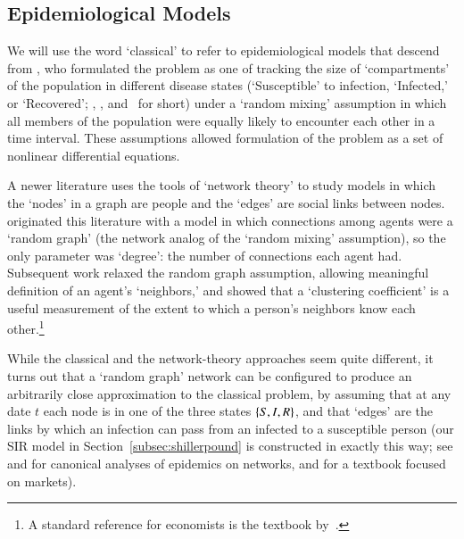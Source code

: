 \subsection{Epidemiological Models}\label{subsec:epiNet}

We will use the word `classical' to refer to epidemiological models that descend from \cite{kermack_contribution_1927}, who formulated the problem as one of tracking the size of `compartments' of the population in different disease states (`Susceptible' to infection, `Infected,' or `Recovered'; \Susceptible, \Infected, and \Recovered~for short) under a `random mixing' assumption in which all members of the population were equally likely to encounter each other in a time interval.  These assumptions allowed formulation of the problem as a set of nonlinear differential equations.

A newer literature uses the tools of `network theory' to study models in which the `nodes' in a graph are people and the `edges' are social links between nodes.  \cite{erdos1960evolution} originated this literature with a model in which connections among agents were a `random graph' (the network analog of the `random mixing' assumption), so the only parameter was `degree': the number of connections each agent had.  Subsequent work relaxed the random graph assumption, allowing meaningful definition of an agent's `neighbors,' and showed that a `clustering coefficient' is a useful measurement of the extent to which a person's neighbors know each other.\footnote{A standard reference for economists is the textbook by~\cite{jackson_social_2010}.}



While the classical and the network-theory approaches seem quite different, it turns out that a `random graph' network can be configured to produce an arbitrarily close approximation to the classical problem, by assuming that at any date $t$ each node is in one of the three states $\{S, I, R\}$, and that `edges' are the links by which an infection can pass from an infected to a susceptible person (our SIR model in Section~\ref{subsec:shillerpound} is constructed in exactly this way; see \cite{newman2002spread} and \cite{jackson_social_2010} for canonical analyses of epidemics on networks, and \cite{easley_kleinberg_2010} for a textbook focused on markets).

